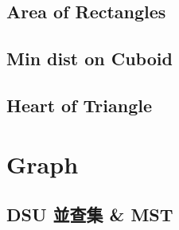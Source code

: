 \documentclass[a4paper,10pt,twocolumn,oneside]{article}
\begin{document}
%

% 

%

%

\subsection{Area of Rectangles}


\subsection{Min dist on Cuboid}


\subsection{Heart of Triangle}


\section{Graph}

%

\subsection{DSU 並查集 \& MST}

\end{document}
